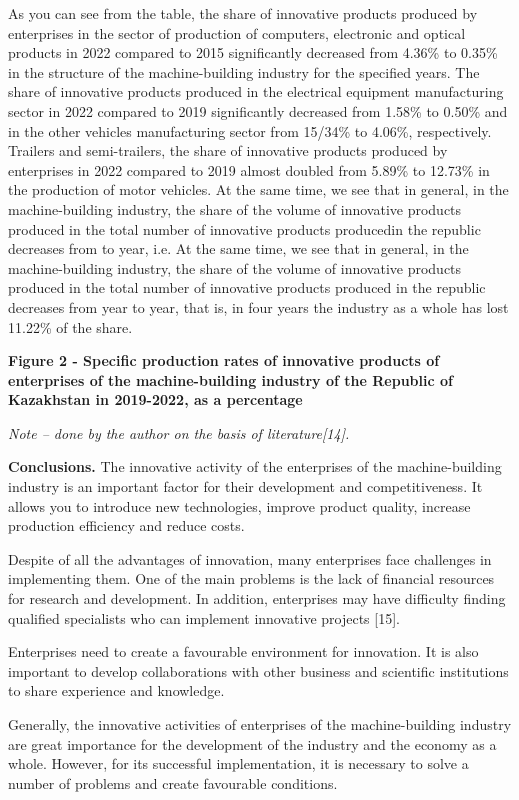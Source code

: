 \begin{multicols}{2}
As you can see from the table, the share of innovative products produced
by enterprises in the sector of production of computers, electronic and
optical products in 2022 compared to 2015 significantly decreased from
4.36\% to 0.35\% in the structure of the machine-building industry for
the specified years. The share of innovative products produced in the
electrical equipment manufacturing sector in 2022 compared to 2019
significantly decreased from 1.58\% to 0.50\% and in the other vehicles
manufacturing sector from 15/34\% to 4.06\%, respectively. Trailers and
semi-trailers, the share of innovative products produced by enterprises
in 2022 compared to 2019 almost doubled from 5.89\% to 12.73\% in the
production of motor vehicles. At the same time, we see that in general,
in the machine-building industry, the share of the volume of innovative
products produced in the total number of innovative products producedin
the republic decreases from to year, i.e. At the same time, we see that
in general, in the machine-building industry, the share of the volume of
innovative products produced in the total number of innovative products
produced in the republic decreases from year to year, that is, in four
years the industry as a whole has lost 11.22\% of the share.
\end{multicols}

{\bfseries Figure 2 - Specific production rates of innovative products of enterprises of the machine-building industry of the Republic of Kazakhstan in 2019-2022, as a percentage}

\emph{Note -- done by the author on the basis of literature{[}14{]}.}

\begin{multicols}{2}
{\bfseries Conclusions.} The innovative activity of the enterprises of the
machine-building industry is an important factor for their development
and competitiveness. It allows you to introduce new technologies,
improve product quality, increase production efficiency and reduce
costs.

Despite of all the advantages of innovation, many enterprises face
challenges in implementing them. One of the main problems is the lack of
financial resources for research and development. In addition,
enterprises may have difficulty finding qualified specialists who can
implement innovative projects {[}15{]}.

Enterprises need to create a favourable environment for innovation. It
is also important to develop collaborations with other business and
scientific institutions to share experience and knowledge.

Generally, the innovative activities of enterprises of the
machine-building industry are great importance for the development of
the industry and the economy as a whole. However, for its successful
implementation, it is necessary to solve a number of problems and create
favourable conditions.
\end{multicols}

